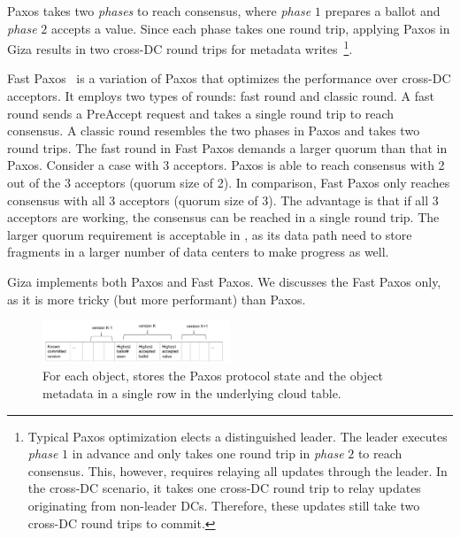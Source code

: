 Paxos takes two {\em phases} to reach consensus, where {\em phase} $1$ prepares a ballot and {\em phase} $2$ accepts a value. Since each phase takes one round trip, applying Paxos in Giza results in two cross-DC round trips for metadata writes~\footnote{Typical Paxos optimization elects a distinguished leader. The leader executes {\em phase} $1$ in advance and only takes one round trip in {\em phase} $2$ to reach consensus. This, however, requires relaying all updates through the leader. In the cross-DC scenario, it takes one cross-DC round trip to relay updates originating from non-leader DCs. Therefore, these updates still take two cross-DC round trips to commit.}.

Fast Paxos~\cite{lamport05fast} is a variation of Paxos that optimizes the performance over cross-DC acceptors. It employs two types of rounds: fast round and classic round. A fast round sends a PreAccept request and takes a single round trip to reach consensus. A classic round resembles the two phases in Paxos and takes two round trips.
The fast round in Fast Paxos demands a larger quorum than that in Paxos. Consider a case with $3$ acceptors. Paxos is able to reach consensus with 2 out of the 3 acceptors (quorum size of 2). In comparison, Fast Paxos only reaches consensus with all 3 acceptors (quorum size of 3). The advantage is that if all 3 acceptors are working, the consensus can be reached in a single round trip. The larger quorum requirement is acceptable in \name, as its data path need to store fragments in a larger number of data centers to make progress as well.


Giza implements both Paxos and Fast Paxos. We discusses the Fast Paxos only, as it is more tricky (but more performant) than  Paxos.

\begin{figure}[tp]
\centering
\includegraphics[width=0.5\textwidth]{fig/Giza_Metadata}
\caption{For each object, \name stores the Paxos protocol state and the object metadata 
in a single row in the underlying cloud table.\label{fig:metadataschema}}
\end{figure}


